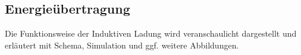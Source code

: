 \subsection{Energieübertragung}\label{sec:energieuebertragung}

Die Funktionsweise der Induktiven Ladung wird veranschaulicht dargestellt und erläutert mit Schema, Simulation und ggf. weitere Abbildungen.